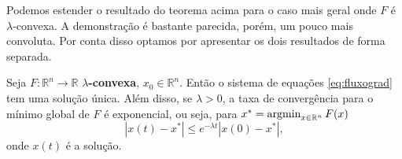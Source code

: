 Podemos estender o resultado do teorema acima para o caso mais geral onde
$F$ é $\lambda$-convexa. A demonstração é bastante parecida, porém, um pouco mais convoluta.
Por conta disso optamos por apresentar os dois resultados de forma separada.

\begin{theorem}
    Seja  $F:\mathbb R^n \to \mathbb R$ \textbf{$\lambda$-convexa}, $x_0 \in \mathbb R^n$.
    Então o sistema de equações \eqref{eq:fluxograd} tem uma solução única.
    Além disso, se $\lambda >0$, a taxa de convergência para o mínimo global
    de $F$ é exponencial, ou seja, para $x^* = \mathop{\rm argmin}_{x\in \mathbb R^n} F(x)$
    \begin{equation}
        |x(t) - x^*| \leq e^{-\lambda t}|x(0)- x^*|,
    \end{equation}
    onde $x(t)$ é a solução.
\end{theorem}